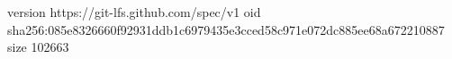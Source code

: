 version https://git-lfs.github.com/spec/v1
oid sha256:085e8326660f92931ddb1c6979435e3cced58c971e072dc885ee68a672210887
size 102663
